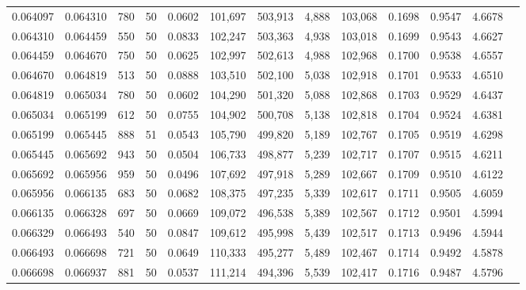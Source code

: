 \begin{tabular}{rrrrrrrrrrrrr}
0.064097 & 0.064310 &   780 &  50 &                                     0.0602 & 101,697 & 503,913 &   4,888 & 103,068 & 0.1698 & 0.9547 & 4.6678 \\
0.064310 & 0.064459 &   550 &  50 &                                     0.0833 & 102,247 & 503,363 &   4,938 & 103,018 & 0.1699 & 0.9543 & 4.6627 \\
0.064459 & 0.064670 &   750 &  50 &                                     0.0625 & 102,997 & 502,613 &   4,988 & 102,968 & 0.1700 & 0.9538 & 4.6557 \\
0.064670 & 0.064819 &   513 &  50 &                                     0.0888 & 103,510 & 502,100 &   5,038 & 102,918 & 0.1701 & 0.9533 & 4.6510 \\
0.064819 & 0.065034 &   780 &  50 &                                     0.0602 & 104,290 & 501,320 &   5,088 & 102,868 & 0.1703 & 0.9529 & 4.6437 \\
0.065034 & 0.065199 &   612 &  50 &                                     0.0755 & 104,902 & 500,708 &   5,138 & 102,818 & 0.1704 & 0.9524 & 4.6381 \\
0.065199 & 0.065445 &   888 &  51 &                                     0.0543 & 105,790 & 499,820 &   5,189 & 102,767 & 0.1705 & 0.9519 & 4.6298 \\
0.065445 & 0.065692 &   943 &  50 &                                     0.0504 & 106,733 & 498,877 &   5,239 & 102,717 & 0.1707 & 0.9515 & 4.6211 \\
0.065692 & 0.065956 &   959 &  50 &                                     0.0496 & 107,692 & 497,918 &   5,289 & 102,667 & 0.1709 & 0.9510 & 4.6122 \\
0.065956 & 0.066135 &   683 &  50 &                                     0.0682 & 108,375 & 497,235 &   5,339 & 102,617 & 0.1711 & 0.9505 & 4.6059 \\
0.066135 & 0.066328 &   697 &  50 &                                     0.0669 & 109,072 & 496,538 &   5,389 & 102,567 & 0.1712 & 0.9501 & 4.5994 \\
0.066329 & 0.066493 &   540 &  50 &                                     0.0847 & 109,612 & 495,998 &   5,439 & 102,517 & 0.1713 & 0.9496 & 4.5944 \\
0.066493 & 0.066698 &   721 &  50 &                                     0.0649 & 110,333 & 495,277 &   5,489 & 102,467 & 0.1714 & 0.9492 & 4.5878 \\
0.066698 & 0.066937 &   881 &  50 &                                     0.0537 & 111,214 & 494,396 &   5,539 & 102,417 & 0.1716 & 0.9487 & 4.5796 \\

\end{tabular}
